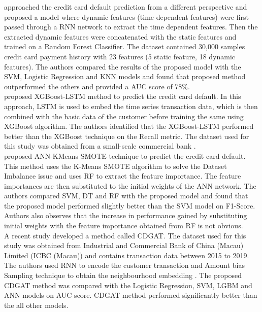 \documentclass[twoside,11pt,a4paper]{article}
\begin{document}
\citep{hsu2019enhanced} approached the credit card default prediction from a different perspective and proposed a model where dynamic features (time dependent features) were first passed through a \acf{RNN} network to extract the time dependent features. Then the extracted dynamic features were concatenated with the static features and trained on a Random Forest Classifier. The dataset contained 30,000 samples credit card payment history with 23 features (5 static feature, 18 dynamic features)\citep{yeh2009comparisons}. The authors compared the results of the proposed model with the \acs{SVM}, Logistic Regression and \acs{KNN} models and found that proposed method outperformed the others and provided a \acs{AUC} score of 78\%.\\

\citep{gao2021research} proposed \acs{XGBoost}-\acs{LSTM} method to predict the credit card default. In this approach, \acs{LSTM} is used to embed the time series transaction data, which is then combined with the basic data of the customer before training the same using \acs{XGBoost} algorithm. The authors identified that the \acs{XGBoost}-\acs{LSTM} performed better than the \acs{XGBoost} technique on the Recall metric. The dataset used for this study was obtained from a small-scale commercial bank \citep{gao2021research}.\\

\cite{chen2021research} proposed \acs{ANN}-KMeans \acs{SMOTE} technique to predict the credit card default. This method uses the K-Means \acs{SMOTE} algorithm to solve the Dataset Imbalance issue and uses \acs{RF} to extract the feature importance. The feature importances are then substituted to the initial weights of the \acs{ANN} network. The authors compared \acs{SVM}, \acs{DT} and \acs{RF} with the proposed model and found that the proposed model performed slightly better than the \acs{SVM} model on F1-Score. Authors also observes that the increase in performance gained by substituting initial weights with the feature importance obtained from \acs{RF} is not obvious.\\

A recent study \citep{wu2022cdgat} developed a method called \acf{CDGAT}. The dataset used for this study was obtained from  Industrial and Commercial Bank of China (Macau) Limited (ICBC (Macau)) and contains transaction data between 2015 to 2019. The authors used \acs{RNN} to encode the customer transaction  and Amount bias Sampling technique to obtain the neighbourhood embedding . The proposed \acs{CDGAT} method was compared with the Logistic Regression, \acs{SVM}, \acs{LGBM} and \acs{ANN}  models on \acs{AUC} score. \acs{CDGAT} method performed significantly better than the all other models. \\
\end{document}
